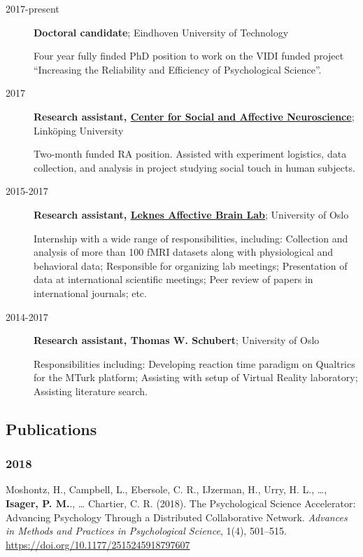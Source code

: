 \documentclass[]{article}
\begin{document}
\begin{description}
\item[2017-present]
\textbf{Doctoral candidate}; Eindhoven University of Technology

Four year fully finded PhD position to work on the VIDI funded project
``Increasing the Reliability and Efficiency of Psychological
Science''.\\
\item[2017]
\textbf{Research assistant,
\href{https://liu.se/en/organisation/liu/ike/csan}{Center for Social and
Affective Neuroscience}}; Linköping University

Two-month funded RA position. Assisted with experiment logistics, data
collection, and analysis in project studying social touch in human
subjects.\\
\item[2015-2017]
\textbf{Research assistant, \href{https://sirileknes.com/}{Leknes
Affective Brain Lab}}; University of Oslo

Internship with a wide range of responsibilities, including: Collection
and analysis of more than 100 fMRI datasets along with physiological and
behavioral data; Responsible for organizing lab meetings; Presentation
of data at international scientific meetings; Peer review of papers in
international journals; etc.\\
\item[2014-2017]
\textbf{Research assistant, Thomas W. Schubert}; University of Oslo

Responsibilities including: Developing reaction time paradigm on
Qualtrics for the MTurk platform; Assisting with setup of Virtual
Reality laboratory; Assisting literature search.
\end{description}

\hypertarget{publications}{%
\subsection{Publications}\label{publications}}

\hypertarget{section}{%
\subsubsection{2018}\label{section}}

Moshontz, H., Campbell, L., Ebersole, C. R., IJzerman, H., Urry, H. L.,
\ldots{}, \textbf{Isager, P. M.}., \ldots{} Chartier, C. R. (2018). The
Psychological Science Accelerator: Advancing Psychology Through a
Distributed Collaborative Network. \emph{Advances in Methods and
Practices in Psychological Science}, 1(4), 501--515.
\url{https://doi.org/10.1177/2515245918797607}
\end{document}
